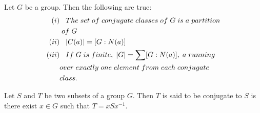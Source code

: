 \begin{teo}
    Let $G$ be a group. Then the following are true:
    \begin{align*}
        (i)&\hspace{.3cm}The\hspace{.1cm}set\hspace{.1cm}of\hspace{.1cm}conjugate\hspace{.1cm}classes\hspace{.1cm}of\hspace{.1cm}G\hspace{.1cm}is\hspace{.1cm}a\hspace{.1cm}partition\\
        &\hspace{.1cm}of\hspace{.1cm}G\\
        (ii)&\hspace{.3cm}|C(a)|=[G:N(a)]\\
        (iii)&\hspace{.3cm}If\hspace{.1cm}G\hspace{.1cm}is\hspace{.1cm}finite,\hspace{.1cm}|G|=\sum[G:N(a)],\hspace{.1cm}a\hspace{.1cm} running \\
        &over\hspace{.1cm} exactly\hspace{.1cm} one\hspace{.1cm} element\hspace{.1cm} from\hspace{.1cm} each\hspace{.1cm} conjugate\hspace{.1cm} \\
        &class.
    \end{align*}
\end{teo}
\begin{defi}
    Let $S$ and $T$ be two subsets of a group $G$. Then $T$ is said to be conjugate to $S$ is there exist $x\in G$ such that $T=xSx^{-1}$.
\end{defi}